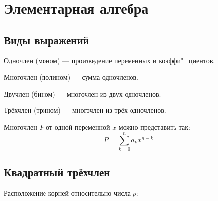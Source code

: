\section{Элементарная алгебра}


\subsection{Виды выражений}

{\bold Одночлен} {\ital (моном)} --- произведение переменных и коэффи"=циентов.

{\bold Многочлен} {\ital (полином)} --- сумма одночленов.

{\bold Двучлен} {\ital (бином)} --- многочлен из двух одночленов.

{\bold Трёхчлен} {\ital (трином)} --- многочлен из трёх одночленов.

Многочлен $P$ от одной переменной $x$ можно представить так:
$$P=\sum^{n}_{k=0}a_kx^{n-k}$$

\subsection{Квадратный трёхчлен}

Расположение корней относительно числа $p$:

